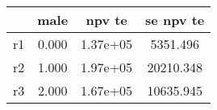 \begin{table}[htbp]
\begin{tabular}{lccc} \hline \hline
 & male  & npv te  & se npv te  \\  \hline 
r1 &     0.000 &  1.37e+05 &  5351.496 \\  
r2 &     1.000 &  1.97e+05 & 20210.348 \\  
r3 &     2.000 &  1.67e+05 & 10635.945 \\  
\hline \hline \end{tabular}
\end{table}
